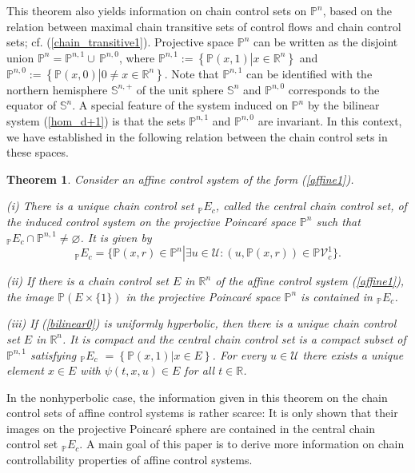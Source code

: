 \documentclass[preprint,12pt]{elsarticle}
\newtheorem{theorem}{Theorem}
\begin{document}
This theorem also yields information on chain control sets on $\mathbb{P}^{n}%
$, based on the relation between maximal chain transitive sets of control
flows and chain control sets; cf. (\ref{chain_transitive1}). Projective space
$\mathbb{P}^{n}$ can be written as the disjoint union $\mathbb{P}%
^{n}=\mathbb{P}^{n,1}\cup\,\mathbb{P}^{n,0}$, where $\mathbb{P}^{n,1}%
:=\left\{  \mathbb{P}(x,1)\left\vert x\in\mathbb{R}^{n}\right.  \right\}  $
and $\mathbb{P}^{n,0}:=\left\{  \mathbb{P}(x,0)\left\vert 0\not =%
x\in\mathbb{R}^{n}\right.  \right\}  $. Note that $\mathbb{P}^{n,1}$ can be
identified with the northern hemisphere $\mathbb{S}^{n,+}$ of the unit sphere
$\mathbb{S}^{n}$ and $\mathbb{P}^{n,0}$ corresponds to the equator of
$\mathbb{S}^{n}$. A special feature of the system induced on $\mathbb{P}^{n}$
by the bilinear system (\ref{hom_d+1}) is that the sets $\mathbb{P}^{n,1}$ and
$\mathbb{P}^{n,0}$ are invariant. In this context, we have established in
\cite[Theorem 35]{ColS24a} the following relation between the chain control
sets in these spaces.

\begin{theorem}
\label{Theorem_E}Consider an affine control system of the form (\ref{affine1}).

(i) There is a unique chain control set $_{\mathbb{P}}E_{c}$, called the
central chain control set, of the induced control system on the projective
Poincar\'{e} space $\mathbb{P}^{n}$ such that $_{\mathbb{P}}E_{c}%
\cap\mathbb{P}^{n,1}\not =\varnothing$. It is given by%
\[
_{\mathbb{P}}E_{c}=\{\mathbb{P}(x,r)\in\mathbb{P}^{n}\left\vert \exists
u\in\mathcal{U}:(u,\mathbb{P}(x,r))\in\mathbb{P}\mathcal{V}_{c}^{1}\right.
\}.
\]


(ii) If there is a chain control set $E$ in $\mathbb{R}^{n}$ of the affine
control system (\ref{affine1}), the image $\mathbb{P}\left(  E\times
\{1\}\right)  $ in the projective Poincar\'{e} space $\mathbb{P}^{n}$ is
contained in $_{\mathbb{P}}E_{c}$.

(iii) If (\ref{bilinear0}) is uniformly hyperbolic, then there is a unique
chain control set $E$ in $\mathbb{R}^{n}$. It is compact and the central chain
control set is a compact subset of $\mathbb{P}^{n,1}$ satisfying
$_{\mathbb{P}}E_{c}$ $=\left\{  \mathbb{P}\left(  x,1\right)  \left\vert x\in
E\right.  \right\}  $. For every $u\in\mathcal{U}$ there exists a unique
element $x\in E$ with $\psi(t,x,u)\in E$ for all $t\in\mathbb{R}$.
\end{theorem}

In the nonhyperbolic case, the information given in this theorem on the chain
control sets of affine control systems is rather scarce: It is only shown that
their images on the projective Poincar\'{e} sphere are contained in the
central chain control set $_{\mathbb{P}}E_{c}$. A main goal of this paper is
to derive more information on chain controllability properties of affine
control systems.
\end{document}
